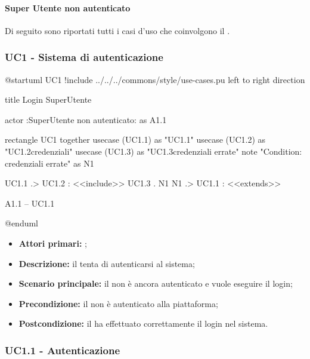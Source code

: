 \documentclass[../analisi-dei-requisiti]{subfiles}
\begin{document}
\paragraph{Super Utente non autenticato}
\label{par:super-utente-non-autenticato}
Di seguito sono riportati tutti i casi d'uso che coinvolgono il .

\subsubsection{UC1 - Sistema di autenticazione}
\label{subsub:UC1}


\begin{plantuml}
  @startuml UC1
  !include ../../../commons/style/use-cases.pu
  left to right direction

  title Login SuperUtente

  actor :SuperUtente non autenticato: as A1.1

  rectangle UC1{
      together {
          usecase (UC1.1) as "UC1.1\nAutenticazione"
          usecase (UC1.2) as "UC1.2\nVerifica credenziali"
          usecase (UC1.3) as "UC1.3\nVisualizzazione credenziali errate"
          note "Condition: credenziali errate" as N1
        }
    }

  UC1.1 .> UC1.2 : <<include>>
  UC1.3 . N1
  N1 .> UC1.1 : <<extends>>

  A1.1 -- UC1.1


  @enduml
\end{plantuml}


\begin{itemize}
  \item \textbf{Attori primari:} ;
  \item \textbf{Descrizione:} il  tenta di autenticarsi al sistema;
  \item \textbf{Scenario principale:} il  non è ancora autenticato e vuole eseguire il login;
  \item \textbf{Precondizione:} il  non è autenticato alla piattaforma;
  \item \textbf{Postcondizione:} il  ha effettuato correttamente il login nel sistema.

\end{itemize}
\subsubsection{UC1.1 - Autenticazione}
\label{subsub:UC1.1}
\end{document}
